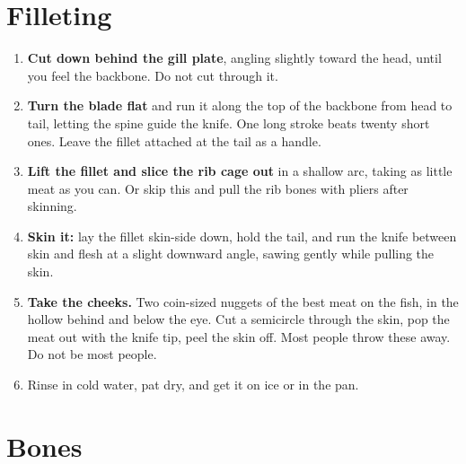\section{Filleting}
\begin{enumerate}
\item \textbf{Cut down behind the gill plate}, angling slightly toward the head, until you feel the backbone. Do not cut through it.
\item \textbf{Turn the blade flat} and run it along the top of the backbone from head to tail, letting the spine guide the knife. One long stroke beats twenty short ones. Leave the fillet attached at the tail as a handle.
\item \textbf{Lift the fillet and slice the rib cage out} in a shallow arc, taking as little meat as you can. Or skip this and pull the rib bones with pliers after skinning.
\item \textbf{Skin it:} lay the fillet skin-side down, hold the tail, and run the knife between skin and flesh at a slight downward angle, sawing gently while pulling the skin.
\item \textbf{Take the cheeks.} Two coin-sized nuggets of the best meat on the fish, in the hollow behind and below the eye. Cut a semicircle through the skin, pop the meat out with the knife tip, peel the skin off. Most people throw these away. Do not be most people.
\item Rinse in cold water, pat dry, and get it on ice or in the pan.
\end{enumerate}

\section{Bones}
\begin{telosfacts}[0.20]
\end{telosfacts}

